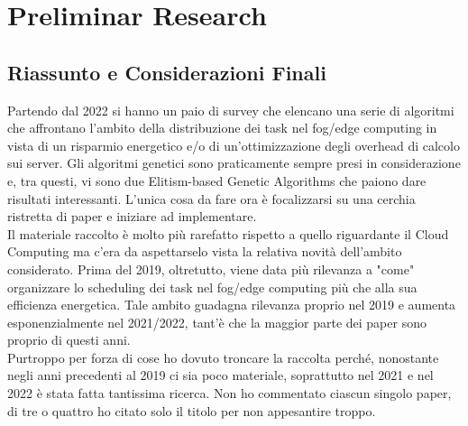 \section{Preliminar Research}\label{sect:preres}

\subsection{Riassunto e Considerazioni Finali}
Partendo dal 2022 si hanno un paio di survey che elencano una serie di algoritmi che affrontano l'ambito della distribuzione dei task nel fog/edge computing in vista
di un risparmio energetico e/o di un'ottimizzazione degli overhead di calcolo sui server.
Gli algoritmi genetici sono praticamente sempre presi in considerazione e, tra questi, vi sono due Elitism-based Genetic Algorithms che paiono dare risultati interessanti.
L'unica cosa da fare ora è focalizzarsi su una cerchia ristretta di paper e iniziare ad implementare.\\

Il materiale raccolto è molto più rarefatto rispetto a quello riguardante il Cloud Computing ma c'era da aspettarselo vista la relativa novità dell'ambito considerato.
Prima del 2019, oltretutto, viene data più rilevanza a "come" organizzare lo scheduling dei task nel fog/edge computing più che alla sua efficienza energetica.
Tale ambito guadagna rilevanza proprio nel 2019 e aumenta esponenzialmente nel 2021/2022, tant'è che la maggior parte dei paper sono proprio di questi anni.\\
Purtroppo per forza di cose ho dovuto troncare la raccolta perché, nonostante negli anni precedenti al 2019 ci sia poco materiale, soprattutto nel 2021 e nel 2022
è stata fatta tantissima ricerca. Non ho commentato ciascun singolo paper, di tre o quattro ho citato solo il titolo per non appesantire troppo.

\newpage

